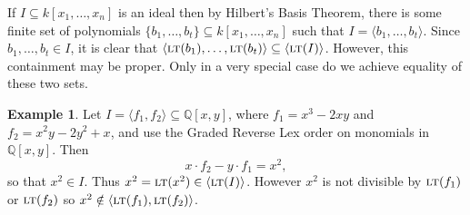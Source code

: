 \documentclass[MS, xcolor=dvipsnames]{wfuthesis}
\def\bQ{\mathbb{Q}}
\def\sbs{\subseteq}
\newcommand{\LT}{\ensuremath{\text{\sc lt}}}
\theoremstyle{definition}
\newtheorem{example}[theorem]{Example}
\begin{document}
If $I \sbs k[x_1,\dots,x_n]$ is an ideal then by Hilbert's Basis Theorem, there is some finite set of polynomials $\{ b_1,\dots,b_t \} \sbs k[x_1,\dots,x_n]$ such that $I = \langle b_1,\dots,b_t \rangle$. Since $b_1,\dots,b_t \in I$, it is clear that $\langle \LT(b_1), \dots, \LT(b_t) \rangle \sbs \langle \LT(I) \rangle$. However, this containment may be proper. Only in a very special case do we achieve equality of these two sets.
\begin{example}
  Let $I = \langle f_1,f_2 \rangle \sbs \bQ[x,y]$, where $f_1=x^3-2xy$ and $f_2=x^2y-2y^2+x$, and use the Graded Reverse Lex order on monomials in $\bQ[x,y]$. Then
  \[ x \cdot f_2 - y \cdot f_1 = x^2, \]
  so that $x^2 \in I$. Thus $x^2 = \LT(x^2) \in \langle \LT(I) \rangle$. However $x^2$ is not divisible by $\LT(f_1)$ or $\LT(f_2)$ so $x^2 \notin \langle \LT(f_1), \LT(f_2) \rangle$.
\end{example}

\end{document}
